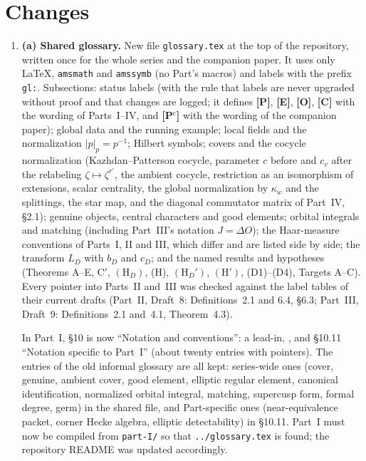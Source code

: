 \documentclass[11pt]{article}
\begin{document}
\section*{Changes}
\begin{enumerate}[leftmargin=*]
\item \textbf{(a) Shared glossary.}  New file \texttt{glossary.tex} at
the top of the repository, written once for the whole series and the
companion paper.  It uses only LaTeX, \texttt{amsmath} and
\texttt{amssymb} (no Part's macros) and labels with the prefix
\texttt{gl:}.  Subsections: status labels (with the rule that labels
are never upgraded without proof and that changes are logged; it
defines \textbf{[P]}, \textbf{[E]}, \textbf{[O]}, \textbf{[C]} with the
wording of Parts~I--IV, and \textbf{[P$^{\mathrm c}$]} with the wording
of the companion paper); global data and the running example; local
fields and the normalization $|p|_p=p^{-1}$; Hilbert symbols; covers
and the cocycle normalization (Kazhdan--Patterson cocycle, parameter
$c$ before and $c_v$ after the relabeling $\zeta\mapsto\zeta^{r'}$, the
ambient cocycle, restriction as an isomorphism of extensions, scalar
centrality, the global normalization by $\kappa_w$ and the splittings,
the star map, and the diagonal commutator matrix of Part~IV, \S2.1);
genuine objects, central characters and good elements; orbital
integrals and matching (including Part~III's notation $J=\Delta O$);
the Haar-measure conventions of Parts~I, II and III, which differ and
are listed side by side; the transform $L_D$ with $b_D$ and $c_D$; and
the named results and hypotheses (Theorems A--E, C$'$, $(\mathrm H_D)$,
(H), $(\mathrm H_D')$, $(\mathrm H')$, (D1)--(D4), Targets A--C).
Every pointer into Parts~II and~III was checked against the label
tables of their current drafts (Part~II, Draft~8: Definitions~2.1 and
6.4, \S6.3; Part~III, Draft~9: Definitions~2.1 and~4.1,
Theorem~4.3).

In Part~I, \S10 is now ``Notation and conventions'': a lead-in,
\verb||, and \S10.11 ``Notation specific to Part~I''
(about twenty entries with pointers).  The entries of the old informal
glossary are all kept: series-wide ones (cover, genuine, ambient
cover, good element, elliptic regular element, canonical
identification, normalized orbital integral, matching, supercusp form,
formal degree, germ) in the shared file, and Part-specific ones
(near-equivalence packet, corner Hecke algebra, elliptic
detectability) in \S10.11.  Part~I must now be compiled from
\texttt{part-I/} so that \texttt{../glossary.tex} is found; the
repository README was updated accordingly.


\end{enumerate}
\end{document}

